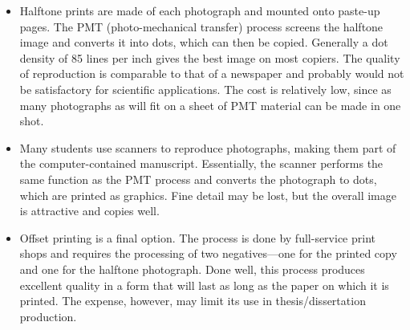 \begin{itemize}
\begin{center}
  \end{center}
\item Halftone prints are made of each photograph and mounted onto
  paste-up pages. The PMT (photo-mechanical transfer) process screens
  the halftone image and converts it into dots, which can then be
  copied. Generally a dot density of 85 lines per inch gives the best
  image on most copiers. The quality of reproduction is comparable to
  that of a newspaper and probably would not be satisfactory for
  scientific applications. The cost is relatively low, since as many
  photographs as will fit on a sheet of PMT material can be made in
  one shot.
\item Many students use scanners to reproduce photographs, making them
  part of the computer-contained manuscript. Essentially, the scanner
  performs the same function as the PMT process and converts the
  photograph to dots, which are printed as graphics. Fine detail may
  be lost, but the overall image is attractive and copies well.
\item Offset printing is a final option. The process is done by
  full-service print shops and requires the processing of two
  negatives---one for the printed copy and one for the halftone
  photograph. Done well, this process produces excellent quality in a
  form that will last as long as the paper on which it is printed. The
  expense, however, may limit its use in the\-sis/dis\-ser\-ta\-tion
  production.
\end{itemize}


